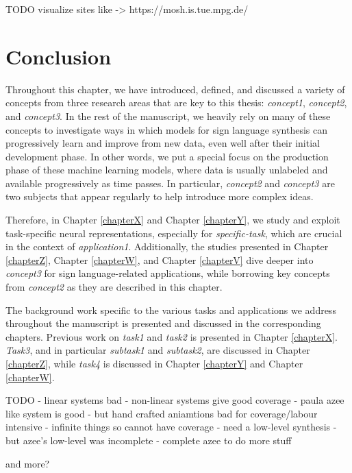 TODO visualize sites like -> https://mosh.is.tue.mpg.de/

\section{Conclusion}

Throughout this chapter, we have introduced, defined, and discussed a variety of concepts from three research areas that are key to this thesis: \textit{concept1}, \textit{concept2}, and \textit{concept3}. In the rest of the manuscript, we heavily rely on many of these concepts to investigate ways in which models for sign language synthesis can progressively learn and improve from new data, even well after their initial development phase. In other words, we put a special focus on the production phase of these machine learning models, where data is usually unlabeled and available progressively as time passes. In particular, \textit{concept2} and \textit{concept3} are two subjects that appear regularly to help introduce more complex ideas.

Therefore, in Chapter \ref{chapterX} and Chapter \ref{chapterY}, we study and exploit task-specific neural representations, especially for \textit{specific-task}, which are crucial in the context of \textit{application1}. Additionally, the studies presented in Chapter \ref{chapterZ}, Chapter \ref{chapterW}, and Chapter \ref{chapterV} dive deeper into \textit{concept3} for sign language-related applications, while borrowing key concepts from \textit{concept2} as they are described in this chapter.

The background work specific to the various tasks and applications we address throughout the manuscript is presented and discussed in the corresponding chapters. Previous work on \textit{task1} and \textit{task2} is presented in Chapter \ref{chapterX}. \textit{Task3}, and in particular \textit{subtask1} and \textit{subtask2}, are discussed in Chapter \ref{chapterZ}, while \textit{task4} is discussed in Chapter \ref{chapterY} and Chapter \ref{chapterW}.


TODO
- linear systems bad
- non-linear systems give good coverage
- paula azee like system is good
- but hand crafted aniamtions bad for coverage/labour intensive - infinite things so cannot have coverage
- need a low-level synthesis
- but azee's low-level was incomplete
- complete azee to do more stuff 

and more?